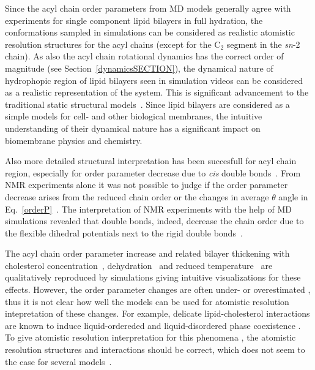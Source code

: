 \documentclass[aps,prl,superscriptaddress,twocolumn]{revtex4}
\begin{document}
Since the acyl chain order parameters from MD models generally 
agree with experiments for single component lipid bilayers in full hydration, 
the conformations sampled in simulations
can be considered as realistic atomistic resolution structures for 
the acyl chains (except for the C$_2$ segment in the {\it sn}-2 chain).
As also the acyl chain rotational dynamics has the correct order of magnitude 
(see Section~\ref{dynamicsSECTION}), the dynamical nature of 
hydrophopic region of lipid bilayers seen in simulation videos
can be considered as a realistic representation of the system. 
This is significant advancement to the traditional static structural 
models~\cite{seelig74,schindler75,seelig78,baenziger91}.
Since lipid bilayers are considered as a simple models for cell- and other 
biological membranes, the intuitive understanding of their dynamical nature 
has a significant impact on biomembrane physics and chemistry. 

Also more detailed structural interpretation has been succesfull for
acyl chain region, especially for order parameter decrease due to {\it cis} double
bonds~\cite{feller02,huber02,eldho03,stillwell03,gawrisch03,bachar04,ollila07a}.
From NMR experiments alone it was not possible to judge if 
the order parameter decrease arises from the reduced chain order or the changes in 
average $\theta$ angle in Eq.~\ref{orderP}~\cite{stillwell03,gawrisch03}.
The interpretation of NMR experiments with the help of MD simulations revealed that
double bonds, indeed, decrease the chain order due to the flexible dihedral
potentials next to the rigid double bonds~\cite{feller02,huber02,eldho03,stillwell03,gawrisch03,bachar04,ollila07a}.

The acyl chain order parameter increase and related bilayer thickening with cholesterol 
concentration~\cite{vermeer07,zhu07,lim12,ferreira13,jambeck13,madej15},
dehydration~\cite{hogberg06,mashl01} and reduced temperature~\cite{zhuang14} are qualitatively reproduced 
by simulations giving intuitive visualizations for these effects. However, the order parameter
changes are often under- or overestimated \cite{hogberg06,lim12,zhuang14,ferreira13}, thus
it is not clear how well the models can be used for atomistic resolution intepretation of these changes.
For example, delicate lipid-cholesterol interactions are known to induce liquid-ordereded and liquid-disordered
phase coexistence \cite{ipsen87}. To give atomistic resolution interpretation for this phenomena \cite{rog09,somerharju09,rog14,sodt14}, 
the atomistic resolution structures and interactions should be correct, which does not seem to the case for 
several models~\cite{lim12,ferreira13,madej15}.
\end{document}
